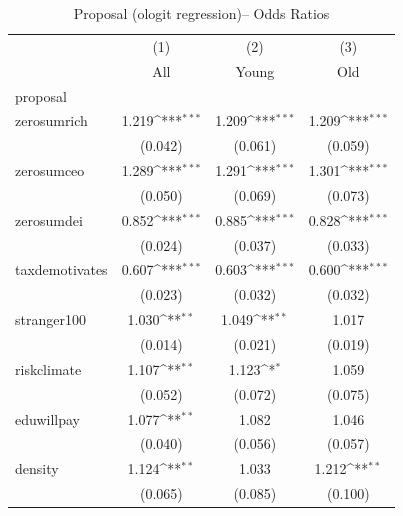 \begin{table}[htbp]\centering
\def\sym#1{\ifmmode^{#1}\else\(^{#1}\)\fi}
\caption{Proposal (ologit regression)-- Odds Ratios}
\begin{tabular}{l*{3}{c}}
\toprule
            &\multicolumn{1}{c}{(1)}&\multicolumn{1}{c}{(2)}&\multicolumn{1}{c}{(3)}\\
            &\multicolumn{1}{c}{All}&\multicolumn{1}{c}{Young}&\multicolumn{1}{c}{Old}\\
\midrule
proposal    &                     &                     &                     \\
zerosumrich &       1.219\sym{***}&       1.209\sym{***}&       1.209\sym{***}\\
            &     (0.042)         &     (0.061)         &     (0.059)         \\
\addlinespace
zerosumceo  &       1.289\sym{***}&       1.291\sym{***}&       1.301\sym{***}\\
            &     (0.050)         &     (0.069)         &     (0.073)         \\
\addlinespace
zerosumdei  &       0.852\sym{***}&       0.885\sym{***}&       0.828\sym{***}\\
            &     (0.024)         &     (0.037)         &     (0.033)         \\
\addlinespace
taxdemotivates&       0.607\sym{***}&       0.603\sym{***}&       0.600\sym{***}\\
            &     (0.023)         &     (0.032)         &     (0.032)         \\
\addlinespace
stranger100 &       1.030\sym{**} &       1.049\sym{**} &       1.017         \\
            &     (0.014)         &     (0.021)         &     (0.019)         \\
\addlinespace
riskclimate &       1.107\sym{**} &       1.123\sym{*}  &       1.059         \\
            &     (0.052)         &     (0.072)         &     (0.075)         \\
\addlinespace
eduwillpay  &       1.077\sym{**} &       1.082         &       1.046         \\
            &     (0.040)         &     (0.056)         &     (0.057)         \\
\addlinespace
density     &       1.124\sym{**} &       1.033         &       1.212\sym{**} \\
            &     (0.065)         &     (0.085)         &     (0.100)         \\

\end{tabular}
\end{table}
